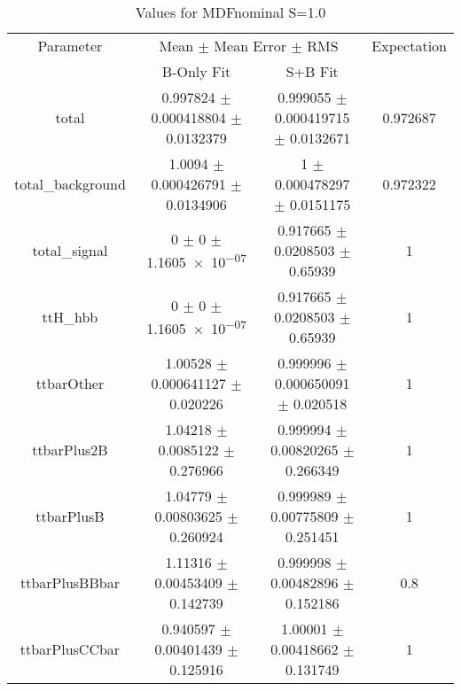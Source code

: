 \begin{table}
\centering
\caption{Values for MDFnominal S=1.0}
\begin{tabular}{cccc}
\toprule
Parameter & \multicolumn{2}{c}{Mean $\pm$ Mean Error $\pm$ RMS} & Expectation\\
 & B-Only Fit & S+B Fit & \\
\midrule
total & \num{0.997824} $\pm$ \num{0.000418804} $\pm$ \num{0.0132379} & \num{0.999055} $\pm$ \num{0.000419715} $\pm$ \num{0.0132671} & \num{0.972687}\\
total\_background & \num{1.0094} $\pm$ \num{0.000426791} $\pm$ \num{0.0134906} & \num{1} $\pm$ \num{0.000478297} $\pm$ \num{0.0151175} & \num{0.972322}\\
total\_signal & \num{0} $\pm$ \num{0} $\pm$ \num{1.1605e-07} & \num{0.917665} $\pm$ \num{0.0208503} $\pm$ \num{0.65939} & \num{1}\\
ttH\_hbb & \num{0} $\pm$ \num{0} $\pm$ \num{1.1605e-07} & \num{0.917665} $\pm$ \num{0.0208503} $\pm$ \num{0.65939} & \num{1}\\
ttbarOther & \num{1.00528} $\pm$ \num{0.000641127} $\pm$ \num{0.020226} & \num{0.999996} $\pm$ \num{0.000650091} $\pm$ \num{0.020518} & \num{1}\\
ttbarPlus2B & \num{1.04218} $\pm$ \num{0.0085122} $\pm$ \num{0.276966} & \num{0.999994} $\pm$ \num{0.00820265} $\pm$ \num{0.266349} & \num{1}\\
ttbarPlusB & \num{1.04779} $\pm$ \num{0.00803625} $\pm$ \num{0.260924} & \num{0.999989} $\pm$ \num{0.00775809} $\pm$ \num{0.251451} & \num{1}\\
ttbarPlusBBbar & \num{1.11316} $\pm$ \num{0.00453409} $\pm$ \num{0.142739} & \num{0.999998} $\pm$ \num{0.00482896} $\pm$ \num{0.152186} & \num{0.8}\\
ttbarPlusCCbar & \num{0.940597} $\pm$ \num{0.00401439} $\pm$ \num{0.125916} & \num{1.00001} $\pm$ \num{0.00418662} $\pm$ \num{0.131749} & \num{1}\\
\bottomrule
\end{tabular}
\end{table}